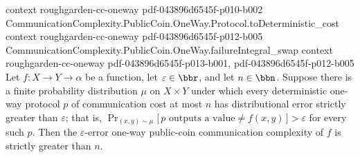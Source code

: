 \begin{theorem}
  {context}
  {roughgarden-cc-oneway}
  {pdf-043896d6545f-p010-b002}
\proofstep
  {CommunicationComplexity.PublicCoin.OneWay.Protocol.toDeterministic_cost}
  {context}
  {roughgarden-cc-oneway}
  {pdf-043896d6545f-p012-b005}
\proofstep
  {CommunicationComplexity.PublicCoin.OneWay.failureIntegral_swap}
  {context}
  {roughgarden-cc-oneway}
  {pdf-043896d6545f-p013-b001,
    pdf-043896d6545f-p012-b005}
Let $f : X \to Y \to \alpha$ be a function, let $\varepsilon \in \bbr$, and let $n \in
\bbn$. Suppose there is a finite probability distribution $\mu$ on $X \times Y$ under
which every deterministic one-way protocol $p$ of communication cost at most $n$ has
distributional error strictly greater than $\varepsilon$; that is,
$\Pr_{(x,y)\sim\mu}\bigl[\,p\text{ outputs a value}\neq f(x,y)\,\bigr] > \varepsilon$
for every such $p$. Then the $\varepsilon$-error one-way public-coin communication
complexity of $f$ is strictly greater than $n$.
\end{theorem}
